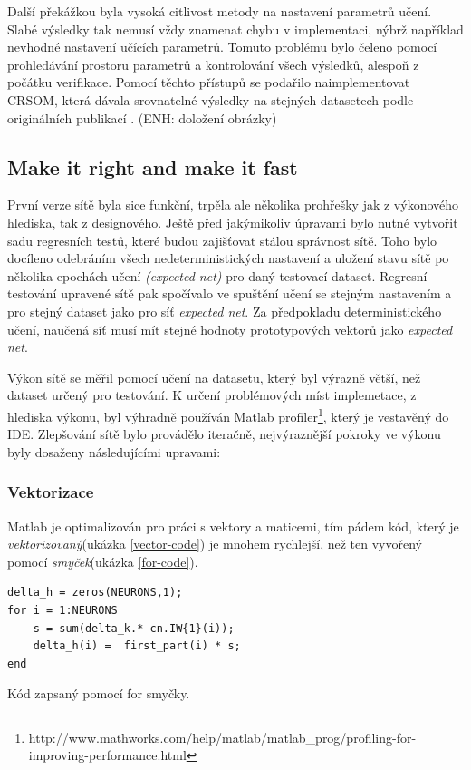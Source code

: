 \documentclass[thesis=M,czech]{FITthesis}[2012/06/26]
\begin{document}
Další překážkou byla vysoká citlivost metody na nastavení parametrů učení\cite{hartono14}. Slabé výsledky tak nemusí vždy znamenat chybu v implementaci, nýbrž například nevhodné nastavení učících parametrů. Tomuto problému bylo čeleno pomocí prohledávání prostoru parametrů a kontrolování všech výsledků, alespoň z počátku verifikace.
Pomocí těchto přístupů se podařilo naimplementovat CRSOM, která dávala srovnatelné výsledky na stejných datasetech podle originálních publikací \cite{hartono14}. (ENH: doložení obrázky)

\subsection{Make it right and make it fast}

První verze sítě byla sice funkční, trpěla ale několika prohřešky jak z výkonového hlediska, tak z designového. Ještě před jakýmikoliv úpravami bylo nutné vytvořit sadu regresních testů, které budou zajišťovat stálou správnost sítě. Toho bylo docíleno odebráním všech nedeterministických nastavení a uložení stavu sítě po několika epochách učení \textit{(expected net)} pro daný testovací dataset.  Regresní testování upravené sítě pak spočívalo ve spuštění učení se stejným nastavením a pro stejný dataset jako pro síť \textit{expected net}. Za předpokladu deterministického učení, naučená síť musí mít stejné hodnoty prototypových vektorů jako \textit{expected net}.

Výkon sítě se měřil pomocí učení na datasetu, který byl výrazně větší, než dataset určený pro testování. K určení problémových míst implemetace, z hlediska výkonu, byl výhradně používán Matlab profiler\footnote{http://www.mathworks.com/help/matlab/matlab\_prog/profiling-for-improving-performance.html}, který je vestavěný do IDE. Zlepšování sítě bylo provádělo iteračně, nejvýraznější pokroky ve výkonu byly dosaženy následujícími upravami:





\subsubsection*{Vektorizace}
Matlab je optimalizován pro práci s vektory a maticemi, tím pádem kód, který je \textit{vektorizovaný}(ukázka \ref{vector-code}) je mnohem rychlejší\cite{vector}, než ten vyvořený pomocí \textit{smyček}(ukázka \ref{for-code}).


\begin{listing}
\begin{verbatim}
delta_h = zeros(NEURONS,1);
for i = 1:NEURONS
    s = sum(delta_k.* cn.IW{1}(i));
    delta_h(i) =  first_part(i) * s;
end
\end{verbatim} 
\caption{Kód zapsaný pomocí for smyčky.} 
\label{for-code}
\end{listing}
\end{document}
